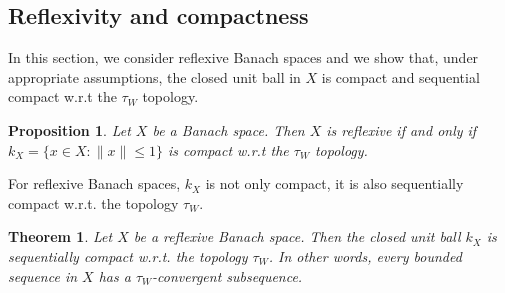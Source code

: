 \documentclass[11pt,a4paper]{article}
\newtheorem{thm}{Theorem}[section]
\newtheorem{prop}{Proposition}[section]
\theoremstyle{definition}
\begin{document}
\subsection{Reflexivity and compactness}
In this section, we consider reflexive Banach spaces and we show that, under appropriate assumptions, the closed unit ball in $X$ is compact and sequential compact w.r.t the $\tau_W$ topology. 
\begin{prop} Let $X$ be a Banach space. Then $X$ is reflexive if and only if $k_X= \lbrace x \in X : \|x\| \leq 1\rbrace$ is compact w.r.t the $\tau_W$ topology. 
\end{prop}
\newpage
\noindent For reflexive Banach spaces, $k_X$ is not only compact, it is also sequentially compact w.r.t. the topology $\tau_W$. 
\begin{thm} Let $X$ be a reflexive Banach space. Then the closed unit ball $k_X$ is sequentially compact w.r.t. the topology $\tau_W$. In other words, every bounded sequence in $X$ has a $\tau_W$-convergent subsequence. 
\end{thm}
\end{document}
